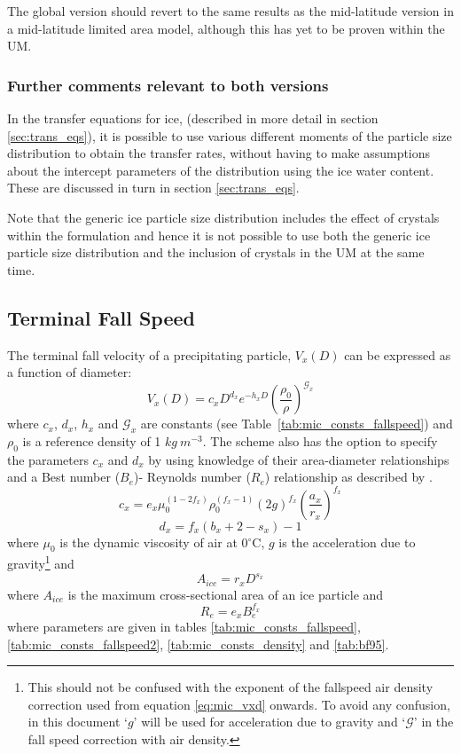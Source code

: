 \documentclass{UMDP_article}
\def\bq{\begin{equation}}
\def\eq{\end{equation}}
\begin{document}
The global version should revert to the same results as the mid-latitude version 
in a mid-latitude limited area model, although this has yet to be proven within
the UM. 

\subsubsection{Further comments relevant to both versions}
\label{sec:field_psd_fc}
In the transfer equations for ice, (described in more detail in section 
\ref{sec:trans_eqs}), it is possible to use various different moments of 
the particle size distribution to obtain the transfer rates, without having
to make assumptions about the intercept parameters of the distribution using 
the ice water content. These are discussed in turn in section 
\ref{sec:trans_eqs}.

Note that the generic ice particle size distribution includes the effect of
crystals within the formulation and hence it is not possible to use both the
generic ice particle size distribution and the inclusion of crystals in the UM
at the same time.  

\subsection{Terminal Fall Speed}

The terminal fall velocity of a precipitating particle, $V_x(D)$ can
be expressed as a function of diameter:
\bq
   V_x(D)=c_xD^{d_x} e^{-h_xD} \left( \frac{\rho_0}{\rho}\right) ^{\mathcal{G}_x}
\label{eq:mic_vxd}
\eq
where $c_x$, $d_x$, $h_x$ and $\mathcal{G}_x$ are constants
(see Table~\ref{tab:mic_consts_fallspeed}) and $\rho_0$ is a reference density
of 1 $kg~m^{-3}$.
The scheme also has the option to specify the parameters $c_x$ and $d_x$ 
by using knowledge of their area-diameter relationships and a Best number 
($B_e$)- Reynolds number ($R_e$) relationship as described by 
\cite{Mitchell:1996}. 
\bq
   c_x=e_x \mu_0^{(1-2f_x)} \rho_0^{(f_x-1)}(2 g)^{f_x}  \left(
   \frac{a_x}{r_x}\right) ^{f_x}
\eq
\bq
   d_x=f_x (b_x + 2 - s_x) - 1
\eq
where $\mu_0$ is the dynamic viscosity of air at 
0$^{\circ}$C, $g$ is the
acceleration due to gravity\footnote{This should not be confused with 
the exponent of the fallspeed air density correction used from equation 
\ref{eq:mic_vxd} 
onwards. To avoid any confusion, in this document `$g$' will be used for
acceleration due to gravity and `$\mathcal{G}$' in the fall speed correction
with air density.} and
\bq
   A_{ice}=r_x D^{s_x}
\eq
where $A_{ice}$ is the maximum cross-sectional area of an ice particle and
\bq
   R_e=e_x B_e^{f_x}
\eq
where parameters are given in tables \ref{tab:mic_consts_fallspeed},
\ref{tab:mic_consts_fallspeed2}, \ref{tab:mic_consts_density} and
\ref{tab:bf95}.
\end{document}

